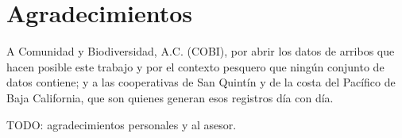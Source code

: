 \chapter*{Agradecimientos}

A Comunidad y Biodiversidad, A.C. (COBI), por abrir los datos de arribos que hacen posible
este trabajo y por el contexto pesquero que ningún conjunto de datos contiene; y a las
cooperativas de San Quintín y de la costa del Pacífico de Baja California, que son quienes
generan esos registros día con día.

TODO: agradecimientos personales y al asesor.
\cleardoublepage
